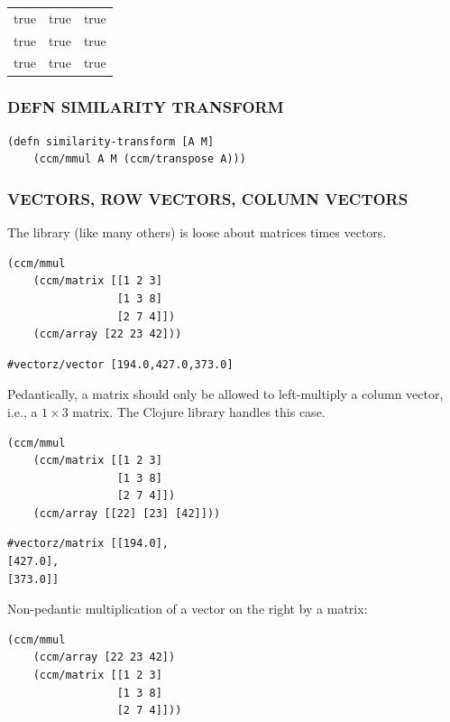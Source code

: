 \documentclass[10pt,oneside,x11names]{article}
\begin{document}
\begin{center}
\begin{tabular}{lll}
true & true & true\\
true & true & true\\
true & true & true\\
\end{tabular}
\end{center}

\subsubsection{DEFN SIMILARITY TRANSFORM}
\label{similarity-transform}
\begin{verbatim}
(defn similarity-transform [A M]
    (ccm/mmul A M (ccm/transpose A)))
\end{verbatim}

\subsubsection{VECTORS, ROW VECTORS, COLUMN VECTORS}
\label{vectors-row-vectors-column-vectors}
The library (like many others) is loose about matrices times vectors.

\begin{verbatim}
(ccm/mmul
    (ccm/matrix [[1 2 3]
                 [1 3 8]
                 [2 7 4]])
    (ccm/array [22 23 42]))
\end{verbatim}

\begin{verbatim}
#vectorz/vector [194.0,427.0,373.0]
\end{verbatim}


Pedantically, a matrix should only be allowed to left-multiply a column
vector, i.e., a \(1\times{3}\) matrix. The Clojure library handles this
case.

\begin{verbatim}
(ccm/mmul
    (ccm/matrix [[1 2 3]
                 [1 3 8]
                 [2 7 4]])
    (ccm/array [[22] [23] [42]]))
\end{verbatim}

\begin{verbatim}
#vectorz/matrix [[194.0],
[427.0],
[373.0]]
\end{verbatim}


Non-pedantic multiplication of a vector on the right by a matrix:

\begin{verbatim}
(ccm/mmul
    (ccm/array [22 23 42])
    (ccm/matrix [[1 2 3]
                 [1 3 8]
                 [2 7 4]]))
\end{verbatim}
\end{document}

